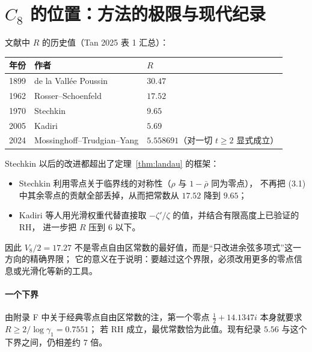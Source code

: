 \documentclass[11pt]{article}
\begin{document}
\section{$C_8$ 的位置：方法的极限与现代纪录}
文献中 $R$ 的历史值（Tan 2025 表 1 汇总）：
\begin{center}
\small
\begin{tabular}{lll}
\toprule
年份 & 作者 & $R$\\
\midrule
1899 & de la Vallée Poussin & $30.47$\\
1962 & Rosser--Schoenfeld & $17.52$\\
1970 & Stechkin & $9.65$\\
2005 & Kadiri & $5.69$\\
2024 & Mossinghoff--Trudgian--Yang & $5.558691$（对一切 $t\ge2$ 显式成立）\\
\bottomrule
\end{tabular}
\end{center}
Stechkin 以后的改进都超出了定理~\ref{thm:landau} 的框架：
\begin{itemize}
 \item Stechkin 利用零点关于临界线的对称性（$\rho$ 与 $1-\bar\rho$ 同为零点），
 不再把 (3.1) 中其余零点的贡献全部丢掉，从而把常数从 $17.52$ 降到 $9.65$；
 \item Kadiri 等人用光滑权重代替直接取 $-\zeta'/\zeta$ 的值，并结合有限高度上已验证的 RH，
 进一步把 $R$ 压到 $6$ 以下。
\end{itemize}
因此 $V_8/2=17.27$ 不是零点自由区常数的最好值，而是“只改进余弦多项式”这一方向的精确界限；
它的意义在于说明：要越过这个界限，必须改用更多的零点信息或光滑化等新的工具。

\paragraph{一个下界} 由附录 F 中关于经典零点自由区常数的注，第一个零点 $\tfrac12+14.1347i$ 本身就要求 $R\ge2/\log\gamma_1=0.7551$；
若 RH 成立，最优常数恰为此值。现有纪录 $5.56$ 与这个下界之间，仍相差约 $7$ 倍。
\end{document}
